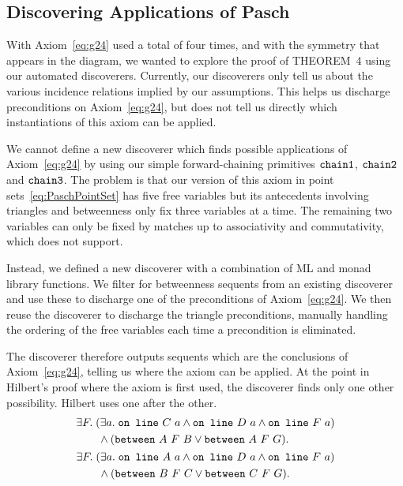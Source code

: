 \subsection{Discovering Applications of Pasch}\label{sec:PaschDiscoverer}
With Axiom~\ref{eq:g24} used a total of four times, and with the symmetry that appears in the diagram, we wanted to explore the proof of THEOREM~4 using our automated discoverers. Currently, our discoverers only tell us about the various incidence relations implied by our assumptions. This helps us discharge preconditions on Axiom~\ref{eq:g24}, but does not tell us directly which instantiations of this axiom can be applied.

We cannot define a new discoverer which finds possible applications of Axiom~\ref{eq:g24} by using our simple forward-chaining primitives $\texttt{chain1}$, $\texttt{chain2}$ and $\texttt{chain3}$. The problem is that our version of this axiom in point sets~\eqref{eq:PaschPointSet} has five free variables but its antecedents involving triangles and betweenness only fix three variables at a time. The remaining two variables can only be fixed by matches up to associativity and commutativity, which  does not support.

Instead, we defined a new discoverer  with a combination of ML and monad library functions. We filter for betweenness sequents from an existing discoverer and use these to discharge one of the preconditions of Axiom~\ref{eq:g24}. We then reuse the discoverer  to discharge the triangle preconditions, manually handling the ordering of the free variables each time a precondition is eliminated. 

The  discoverer therefore outputs sequents which are the conclusions of Axiom~\ref{eq:g24}, telling us where the axiom can be applied. At the point in Hilbert's proof where the axiom is first used, the discoverer finds only one other possibility. Hilbert uses one after the other.
\begingroup
\allowdisplaybreaks
\begin{gather*}
\begin{split}
&\exists F.\; (\exists a.\; \code{on\ line}\ C\ a \wedge \code{on\ line}\ D\ a \wedge \code{on\ line}\ F\ a)\\
&\qquad \wedge (\between{A}{F}{B} \vee \between{A}{F}{G}).
\end{split}\\
\begin{split}
&\exists F.\; (\exists a.\; \code{on\ line}\ A\ a \wedge \code{on\ line}\ D\ a \wedge \code{on\ line}\ F\ a)\\
&\qquad \wedge (\between{B}{F}{C} \vee \between{C}{F}{G}).
\end{split}
\end{gather*}
\endgroup

